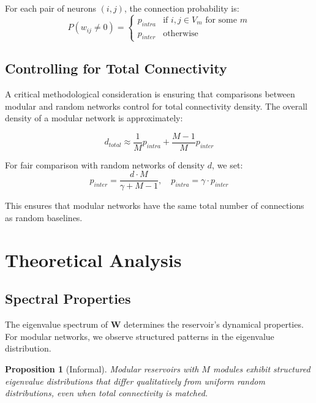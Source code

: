 \documentclass{article}
\newtheorem{proposition}{Proposition}
\begin{document}
For each pair of neurons $(i,j)$, the connection probability is:
\begin{equation}
P(w_{ij} \neq 0) = \begin{cases}
p_{intra} & \text{if } i,j \in V_m \text{ for some } m \\
p_{inter} & \text{otherwise}
\end{cases}
\end{equation}

\subsection{Controlling for Total Connectivity}

A critical methodological consideration is ensuring that comparisons between modular and random networks control for total connectivity density. The overall density of a modular network is approximately:

\begin{equation}
d_{total} \approx \frac{1}{M} p_{intra} + \frac{M-1}{M} p_{inter}
\end{equation}

For fair comparison with random networks of density $d$, we set:
\begin{equation}
p_{inter} = \frac{d \cdot M}{\gamma + M - 1}, \quad p_{intra} = \gamma \cdot p_{inter}
\end{equation}

This ensures that modular networks have the same total number of connections as random baselines.

\section{Theoretical Analysis}

\subsection{Spectral Properties}

The eigenvalue spectrum of $\mathbf{W}$ determines the reservoir's dynamical properties. For modular networks, we observe structured patterns in the eigenvalue distribution.

\begin{proposition}[Informal]
Modular reservoirs with $M$ modules exhibit structured eigenvalue distributions that differ qualitatively from uniform random distributions, even when total connectivity is matched.
\end{proposition}
\end{document}
